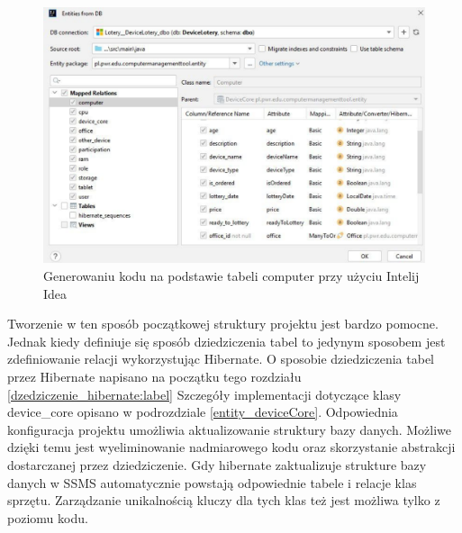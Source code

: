 \begin{figure}[h]
		\centering
    \includegraphics[width=0.7\linewidth]{rys04/generate.pdf}
    \caption{Generowaniu kodu na podstawie tabeli computer przy użyciu Intelij Idea}
    \label{generate:label}
\end{figure}

Tworzenie w ten sposób początkowej struktury projektu jest bardzo pomocne. Jednak kiedy definiuje się sposób dziedziczenia tabel to jedynym sposobem jest zdefiniowanie relacji wykorzystując Hibernate. O sposobie dziedziczenia tabel przez Hibernate napisano na początku tego rozdziału \ref{dzedziczenie_hibernate:label} Szczegóły implementacji dotyczące klasy device\_core opisano w podrozdziale \ref{entity_deviceCore}. Odpowiednia konfiguracja projektu umożliwia aktualizowanie struktury bazy danych. Możliwe dzięki temu jest wyeliminowanie nadmiarowego kodu oraz skorzystanie abstrakcji dostarczanej przez dziedziczenie. Gdy hibernate zaktualizuje strukture bazy danych w SSMS automatycznie powstają odpowiednie tabele i relacje klas sprzętu. Zarządzanie unikalnością kluczy dla tych klas też jest możliwa tylko z poziomu kodu.
 
